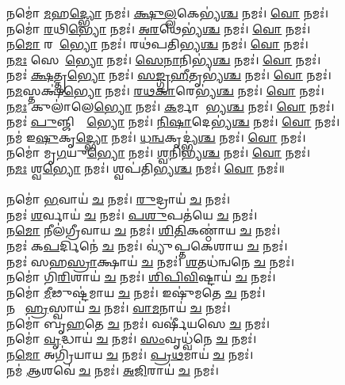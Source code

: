 𑌨𑌮𑍋॑ \ul{𑌮}𑌹\ul{𑌦𑍍𑌭𑍍𑌯𑍋} 𑌨𑌮𑌃॑। \ul{𑌕𑍍𑌷𑍁}\ul{𑌲𑍍𑌲}𑌕𑍇𑌭𑍍𑌯॑\ul{𑌶𑍍𑌚} 𑌨𑌮𑌃॑। \ul{𑌵𑍋} 𑌨𑌮𑌃॑।\\
𑌨𑌮𑍋॑ \ul{𑌰}𑌥𑌿\ul{𑌭𑍍𑌯𑍋} 𑌨𑌮𑌃॑। \ul{𑌅}\ul{𑌰}𑌥𑍇𑌭𑍍𑌯॑\ul{𑌶𑍍𑌚} 𑌨𑌮𑌃॑। \ul{𑌵𑍋} 𑌨𑌮𑌃॑। \\
𑌨\ul{𑌮𑍋} 𑌰𑌥𑍇᳚\ul{𑌭𑍍𑌯𑍋} 𑌨𑌮𑌃॑। 𑌰𑌥॑𑌪𑌤𑌿𑌭𑍍𑌯\ul{𑌶𑍍𑌚} 𑌨𑌮𑌃॑। \ul{𑌵𑍋} 𑌨𑌮𑌃॑।\\
𑌨\ul{𑌮𑌃} 𑌸𑍇𑌨𑌾᳚\ul{𑌭𑍍𑌯𑍋} 𑌨𑌮𑌃॑। \ul{𑌸𑍇}\ul{𑌨𑌾}𑌨𑌿𑌭𑍍𑌯॑\ul{𑌶𑍍𑌚} 𑌨𑌮𑌃॑। \ul{𑌵𑍋} 𑌨𑌮𑌃॑। \\
𑌨𑌮𑌃॑ \ul{𑌕𑍍𑌷}𑌤𑍍𑌤𑍃\ul{𑌭𑍍𑌯𑍋} 𑌨𑌮𑌃॑। \ul{𑌸}\ul{𑌙𑍍𑌗𑍍𑌰}\ul{𑌹𑍀}𑌤𑍃𑌭𑍍𑌯॑\ul{𑌶𑍍𑌚} 𑌨𑌮𑌃॑। \ul{𑌵𑍋} 𑌨𑌮𑌃॑। \\
𑌨\ul{𑌮}𑌸𑍍𑌤𑌕𑍍𑌷॑\ul{𑌭𑍍𑌯𑍋} 𑌨𑌮𑌃॑। \ul{𑌰}\ul{𑌥}\ul{𑌕𑌾}𑌰𑍇𑌭𑍍𑌯॑\ul{𑌶𑍍𑌚} 𑌨𑌮𑌃॑। \ul{𑌵𑍋} 𑌨𑌮𑌃॑। \\
𑌨\ul{𑌮𑌃} 𑌕𑍁𑌲𑌾॑𑌲𑍇\ul{𑌭𑍍𑌯𑍋} 𑌨𑌮𑌃॑। \ul{𑌕}𑌰𑍍𑌮𑌾𑌰𑍇᳚𑌭𑍍𑌯\ul{𑌶𑍍𑌚} 𑌨𑌮𑌃॑। \ul{𑌵𑍋} 𑌨𑌮𑌃॑। \\
𑌨𑌮𑌃॑ \ul{𑌪𑍁}𑌞𑍍𑌜𑌿𑌷𑍍𑌟𑍇᳚\ul{𑌭𑍍𑌯𑍋} 𑌨𑌮𑌃॑। \ul{𑌨𑌿}\ul{𑌷𑌾}𑌦𑍇𑌭𑍍𑌯॑\ul{𑌶𑍍𑌚} 𑌨𑌮𑌃॑। \ul{𑌵𑍋} 𑌨𑌮𑌃॑। \\
𑌨𑌮॑ 𑌇\ul{𑌷𑍁}𑌕𑍃\ul{𑌦𑍍𑌭𑍍𑌯𑍋} 𑌨𑌮𑌃॑। \ul{𑌧}\ul{𑌨𑍍𑌵}𑌕𑍃𑌦𑍍𑌭𑍍𑌯॑\ul{𑌶𑍍𑌚} 𑌨𑌮𑌃॑। \ul{𑌵𑍋} 𑌨𑌮𑌃॑।\\
𑌨𑌮𑍋॑ 𑌮𑍃\ul{𑌗}𑌯𑍁\ul{𑌭𑍍𑌯𑍋} 𑌨𑌮𑌃॑। \ul{𑌶𑍍𑌵}𑌨𑌿𑌭𑍍𑌯॑\ul{𑌶𑍍𑌚} 𑌨𑌮𑌃॑। \ul{𑌵𑍋} 𑌨𑌮𑌃॑। \\
𑌨\ul{𑌮𑌃} 𑌶𑍍𑌵\ul{𑌭𑍍𑌯𑍋} 𑌨𑌮𑌃॑। 𑌶𑍍𑌵𑌪॑𑌤𑌿𑌭𑍍𑌯\ul{𑌶𑍍𑌚} 𑌨𑌮𑌃॑। \ul{𑌵𑍋} 𑌨𑌮𑌃॑॥ \\
\\
𑌨𑌮𑍋॑ \ul{𑌭}𑌵𑌾𑌯॑ \ul{𑌚} 𑌨𑌮𑌃॑। \ul{𑌰𑍁}𑌦𑍍𑌰𑌾𑌯॑ \ul{𑌚} 𑌨𑌮𑌃॑। \\
𑌨𑌮𑌃॑ \ul{𑌶}𑌰𑍍𑌵𑌾𑌯॑ \ul{𑌚} 𑌨𑌮𑌃॑। \ul{𑌪}\ul{𑌶𑍁}𑌪𑌤॑𑌯𑍇 \ul{𑌚} 𑌨𑌮𑌃॑।\\
𑌨\ul{𑌮𑍋} 𑌨𑍀𑌲॑𑌗𑍍𑌰𑍀𑌵𑌾𑌯 \ul{𑌚} 𑌨𑌮𑌃॑। \ul{𑌶𑌿}\ul{𑌤𑌿}𑌕𑌣𑍍𑌠𑌾॑𑌯 \ul{𑌚} 𑌨𑌮𑌃॑। \\
𑌨𑌮𑌃॑ 𑌕\ul{𑌪}𑌰𑍍𑌦𑌿𑌨𑍇॑ \ul{𑌚} 𑌨𑌮𑌃॑। 𑌵𑍍𑌯𑍁॑𑌪𑍍𑌤𑌕𑍇𑌶𑌾𑌯 \ul{𑌚} 𑌨𑌮𑌃॑।\\
𑌨𑌮𑌃॑ 𑌸𑌹\ul{𑌸𑍍𑌰𑌾}𑌕𑍍𑌷𑌾𑌯॑ \ul{𑌚} 𑌨𑌮𑌃॑। \ul{𑌶}𑌤𑌧॑𑌨𑍍𑌵𑌨𑍇 \ul{𑌚} 𑌨𑌮𑌃॑। \\
𑌨𑌮𑍋॑ 𑌗𑌿\ul{𑌰𑌿}𑌶𑌾𑌯॑ \ul{𑌚} 𑌨𑌮𑌃॑। \ul{𑌶𑌿}\ul{𑌪𑌿}\ul{𑌵𑌿}𑌷𑍍𑌟𑌾𑌯॑ \ul{𑌚} 𑌨𑌮𑌃॑।\\
𑌨𑌮𑍋॑ \ul{𑌮𑍀}𑌢𑍁𑌷𑍍𑌟॑𑌮𑌾𑌯 \ul{𑌚} 𑌨𑌮𑌃॑। 𑌇𑌷𑍁॑𑌮𑌤𑍇 \ul{𑌚} 𑌨𑌮𑌃॑। \\
𑌨𑌮𑍋᳚ \ul{𑌹𑍍𑌰}𑌸𑍍𑌵𑌾𑌯॑ \ul{𑌚} 𑌨𑌮𑌃॑। \ul{𑌵𑌾}\ul{𑌮}𑌨𑌾𑌯॑ \ul{𑌚} 𑌨𑌮𑌃॑।\\
𑌨𑌮𑍋॑ 𑌬𑍃\ul{𑌹}𑌤𑍇 \ul{𑌚} 𑌨𑌮𑌃॑। 𑌵𑌰𑍍𑌷𑍀॑𑌯𑌸𑍇 \ul{𑌚} 𑌨𑌮𑌃॑। \\
𑌨𑌮𑍋॑ \ul{𑌵𑍃}𑌦𑍍𑌧𑌾𑌯॑ \ul{𑌚} 𑌨𑌮𑌃॑। \ul{𑌸𑌂}𑌵𑍃𑌧𑍍𑌵॑𑌨𑍇 \ul{𑌚} 𑌨𑌮𑌃॑। \\
𑌨\ul{𑌮𑍋} 𑌅𑌗𑍍𑌰𑌿॑𑌯𑌾𑌯 \ul{𑌚} 𑌨𑌮𑌃॑। \ul{𑌪𑍍𑌰}\ul{𑌥}𑌮𑌾𑌯॑ \ul{𑌚} 𑌨𑌮𑌃॑। \\
𑌨𑌮॑ \ul{𑌆}𑌶𑌵𑍇॑ \ul{𑌚} 𑌨𑌮𑌃॑। \ul{𑌅}\ul{𑌜𑌿}𑌰𑌾𑌯॑ \ul{𑌚} 𑌨𑌮𑌃॑।\\
